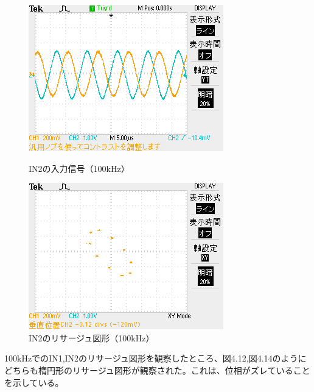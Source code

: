\documentclass{jlreq}
\numberwithin{equation}{section}
\begin{document}
\begin{figure}[H]
  \centering
  \begin{minipage}{0.45\textwidth}
    \centering
    \includegraphics[width=\textwidth, keepaspectratio]{IN2_100kHz_YT.png}
    \caption{IN2の入力信号（100kHz）}
  \end{minipage}
  \hfill
  \begin{minipage}{0.45\textwidth}
    \centering
    \includegraphics[width=\textwidth, keepaspectratio]{IN2_100kHz_XY.png}
    \caption{IN2のリサージュ図形（100kHz）}
  \end{minipage}
\end{figure}

100kHzでのIN1,IN2のリサージュ図形を観察したところ、図4.12,図4.14のようにどちらも楕円形のリサージュ図形が観察された。これは、位相がズレていることを示している。
\end{document}
